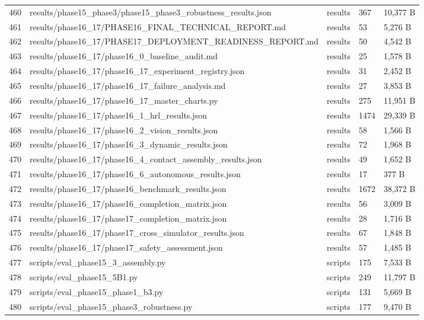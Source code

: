 \documentclass[11pt,a4paper,oneside]{book}
\begin{document}
\begin{longtable}{l l l l l}
460 & results/phase15\_phase3/phase15\_phase3\_robustness\_results.json & results & 367 & 10,377 B \\
461 & results/phase16\_17/PHASE16\_FINAL\_TECHNICAL\_REPORT.md & results & 53 & 5,276 B \\
462 & results/phase16\_17/PHASE17\_DEPLOYMENT\_READINESS\_REPORT.md & results & 50 & 4,542 B \\
463 & results/phase16\_17/phase16\_0\_baseline\_audit.md & results & 25 & 1,578 B \\
464 & results/phase16\_17/phase16\_17\_experiment\_registry.json & results & 31 & 2,452 B \\
465 & results/phase16\_17/phase16\_17\_failure\_analysis.md & results & 27 & 3,853 B \\
466 & results/phase16\_17/phase16\_17\_master\_charts.py & results & 275 & 11,951 B \\
467 & results/phase16\_17/phase16\_1\_hrl\_results.json & results & 1474 & 29,339 B \\
468 & results/phase16\_17/phase16\_2\_vision\_results.json & results & 58 & 1,566 B \\
469 & results/phase16\_17/phase16\_3\_dynamic\_results.json & results & 72 & 1,968 B \\
470 & results/phase16\_17/phase16\_4\_contact\_assembly\_results.json & results & 49 & 1,652 B \\
471 & results/phase16\_17/phase16\_6\_autonomous\_results.json & results & 17 & 377 B \\
472 & results/phase16\_17/phase16\_benchmark\_results.json & results & 1672 & 38,372 B \\
473 & results/phase16\_17/phase16\_completion\_matrix.json & results & 56 & 3,009 B \\
474 & results/phase16\_17/phase17\_completion\_matrix.json & results & 28 & 1,716 B \\
475 & results/phase16\_17/phase17\_cross\_simulator\_results.json & results & 67 & 1,848 B \\
476 & results/phase16\_17/phase17\_safety\_assessment.json & results & 57 & 1,485 B \\
477 & scripts/eval\_phase15\_3\_assembly.py & scripts & 175 & 7,533 B \\
478 & scripts/eval\_phase15\_5B1.py & scripts & 249 & 11,797 B \\
479 & scripts/eval\_phase15\_phase1\_b3.py & scripts & 131 & 5,669 B \\
480 & scripts/eval\_phase15\_phase3\_robustness.py & scripts & 177 & 9,470 B \\

\end{longtable}
\end{document}
